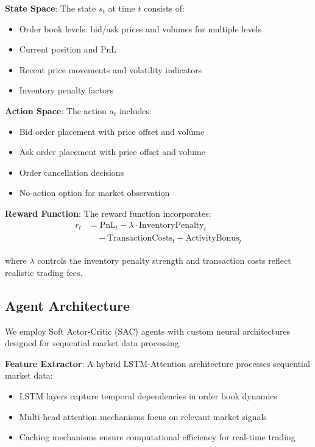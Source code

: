 \documentclass[11pt,a4paper]{article}
\begin{document}
\textbf{State Space}: The state $s_t$ at time $t$ consists of:
\begin{itemize}
\item Order book levels: bid/ask prices and volumes for multiple levels
\item Current position and PnL
\item Recent price movements and volatility indicators
\item Inventory penalty factors
\end{itemize}

\textbf{Action Space}: The action $a_t$ includes:
\begin{itemize}
\item Bid order placement with price offset and volume
\item Ask order placement with price offset and volume
\item Order cancellation decisions
\item No-action option for market observation
\end{itemize}

\textbf{Reward Function}: The reward function incorporates:
\begin{align}
r_t &= \text{PnL}_{t} - \lambda \cdot \text{InventoryPenalty}_t \\
&\quad - \text{TransactionCosts}_t + \text{ActivityBonus}_t
\end{align}

where $\lambda$ controls the inventory penalty strength and transaction costs reflect realistic trading fees.

\subsection{Agent Architecture}

We employ Soft Actor-Critic (SAC) agents with custom neural architectures designed for sequential market data processing.

\textbf{Feature Extractor}: A hybrid LSTM-Attention architecture processes sequential market data:
\begin{itemize}
\item LSTM layers capture temporal dependencies in order book dynamics
\item Multi-head attention mechanisms focus on relevant market signals
\item Caching mechanisms ensure computational efficiency for real-time trading
\end{itemize}
\end{document}

